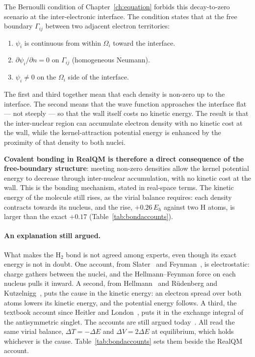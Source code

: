 The Bernoulli condition of Chapter~\ref{ch:equation} forbids this decay-to-zero scenario at the inter-electronic interface. The condition states that at the free boundary $\Gamma_{ij}$ between two adjacent electron territories:
\begin{enumerate}
\item $\psi_i$ is continuous from within $\Omega_i$ toward the interface.
\item $\partial \psi_i / \partial n = 0$ on $\Gamma_{ij}$ (homogeneous Neumann).
\item $\psi_i \ne 0$ on the $\Omega_i$ side of the interface.
\end{enumerate}
The first and third together mean that each density is non-zero up to the interface. The second means that the wave function approaches the interface flat --- not steeply --- so that the wall itself costs no kinetic energy. The result is that the inter-nuclear region can accumulate electron density with no kinetic cost at the wall, while the kernel-attraction potential energy is enhanced by the proximity of that density to both nuclei.

\textbf{Covalent bonding in RealQM is therefore a direct consequence of the free-boundary structure}: meeting non-zero densities allow the kernel potential energy to decrease through inter-nuclear accumulation, with no kinetic cost at the wall. This is the bonding mechanism, stated in real-space terms. The kinetic energy of the molecule still rises, as the virial balance requires: each density contracts towards its nucleus, and the rise, $+0.26\,E_h$ against two H atoms, is larger than the exact $+0.17$ (Table~\ref{tab:bondaccounts}).

\paragraph{An explanation still argued.}
What makes the H$_2$ bond is not agreed among experts, even though its exact energy is not in doubt.
One account, from Slater~\cite{Slater33} and Feynman~\cite{Feynman39}, is electrostatic: charge gathers
between the nuclei, and the Hellmann--Feynman force on each nucleus pulls it inward. A second, from
Hellmann~\cite{Hellmann33} and R\"udenberg and Kutzelnigg~\cite{Ruedenberg62, Kutzelnigg90}, puts the
cause in the kinetic energy: an electron spread over both atoms lowers its kinetic energy, and the
potential energy follows. A third, the textbook account since Heitler and London~\cite{HeitlerLondon27},
puts it in the exchange integral of the antisymmetric singlet. The accounts are still argued
today~\cite{Bacskay13}. All read the same virial balance, $\Delta T = -\Delta E$ and $\Delta V = 2\Delta E$
at equilibrium, which holds whichever is the cause. Table~\ref{tab:bondaccounts} sets them beside the
RealQM account.

